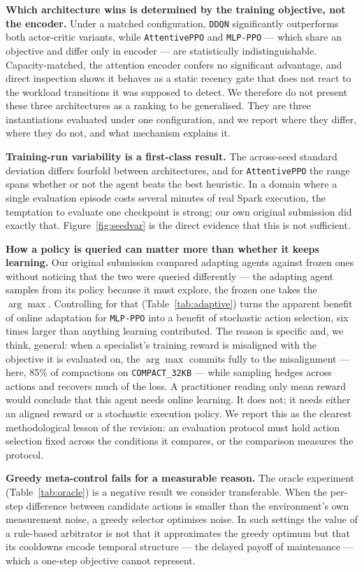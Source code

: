 \documentclass[fleqn,10pt]{wlscirep}
\newcommand{\attentive}{\texttt{AttentivePPO}}
\newcommand{\mlpppo}{\texttt{MLP-PPO}}
\newcommand{\ddqn}{\texttt{DDQN}}
\newcommand{\cthirtytwo}{\texttt{COMPACT\_32KB}}
\begin{document}
\textbf{Which architecture wins is determined by the training objective,
not the encoder.}
Under a matched configuration, \ddqn{} significantly outperforms both
actor-critic variants, while \attentive{} and \mlpppo{} --- which share
an objective and differ only in encoder --- are statistically
indistinguishable. Capacity-matched, the attention encoder confers no
significant advantage, and direct inspection shows it behaves as a
static recency gate that does not react to the workload transitions it
was supposed to detect. We therefore do not present these three
architectures as a ranking to be generalised. They are three
instantiations evaluated under one configuration, and we report where
they differ, where they do not, and what mechanism explains it.

\textbf{Training-run variability is a first-class result.}
The across-seed standard deviation differs fourfold between
architectures, and for \attentive{} the range spans whether or not the
agent beats the best heuristic. In a domain where a single evaluation
episode costs several minutes of real Spark execution, the temptation to
evaluate one checkpoint is strong; our own original submission did
exactly that. Figure~\ref{fig:seedvar} is the direct evidence that this
is not sufficient.

\textbf{How a policy is queried can matter more than whether it keeps
learning.}
Our original submission compared adapting agents against frozen ones
without noticing that the two were queried differently --- the adapting
agent samples from its policy because it must explore, the frozen one
takes the $\arg\max$. Controlling for that (Table~\ref{tab:adaptive})
turns the apparent benefit of online adaptation for \mlpppo{} into a
benefit of stochastic action selection, six times larger than anything
learning contributed. The reason is specific and, we think, general:
when a specialist's training reward is misaligned with the objective it
is evaluated on, the $\arg\max$ commits fully to the misalignment ---
here, 85\% of compactions on \cthirtytwo{} --- while sampling hedges
across actions and recovers much of the loss. A practitioner reading
only mean reward would conclude that this agent needs online learning.
It does not; it needs either an aligned reward or a stochastic execution
policy. We report this as the clearest methodological lesson of the
revision: an evaluation protocol must hold action selection fixed across
the conditions it compares, or the comparison measures the protocol.

\textbf{Greedy meta-control fails for a measurable reason.}
The oracle experiment (Table~\ref{tab:oracle}) is a negative result we
consider transferable. When the per-step difference between candidate
actions is smaller than the environment's own measurement noise, a
greedy selector optimises noise. In such settings the value of a
rule-based arbitrator is not that it approximates the greedy optimum but
that its cooldowns encode temporal structure --- the delayed payoff of
maintenance --- which a one-step objective cannot represent.
\end{document}
